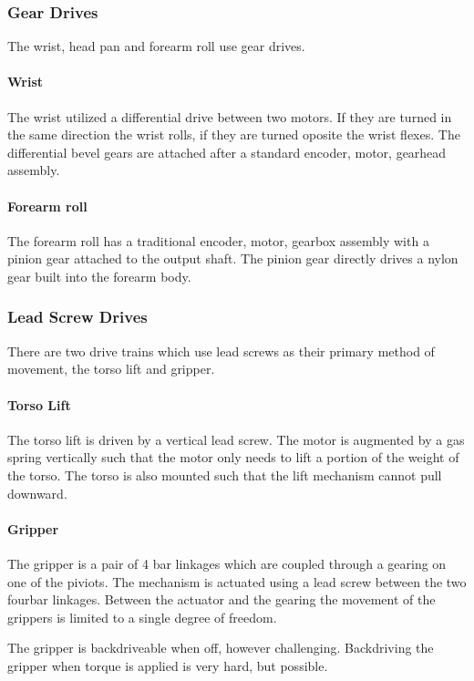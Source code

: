 \subsubsection{Gear Drives}
The wrist, head pan and forearm roll use gear drives.  

\paragraph{Wrist}
The wrist utilized a differential drive between two motors.  If they
are turned in the same direction the wrist rolls, if they are turned
oposite the wrist flexes.  The differential bevel gears are attached
after a standard encoder, motor, gearhead assembly.


\paragraph{Forearm roll}
The forearm roll has a traditional encoder, motor, gearbox assembly
with a pinion gear attached to the output shaft.  The pinion gear
directly drives a nylon gear built into the forearm body.

\subsubsection{Lead Screw Drives}
There are two drive trains which use lead screws as their primary
method of movement, the torso lift and gripper.  

\paragraph{Torso Lift}
The torso lift is driven by a vertical lead screw.  The motor is
augmented by a gas spring vertically such that the motor only needs to
lift a portion of the weight of the torso.  The torso is also mounted
such that the lift mechanism cannot pull downward.

\paragraph{Gripper}
The gripper is a pair of 4 bar linkages which are coupled through a
gearing on one of the piviots.  The mechanism is actuated using a lead
screw between the two fourbar linkages. Between the actuator and the
gearing the movement of the grippers is limited to a single degree of
freedom.

The gripper is backdriveable when off, however challenging.
Backdriving the gripper when torque is applied is very hard, but
possible.

